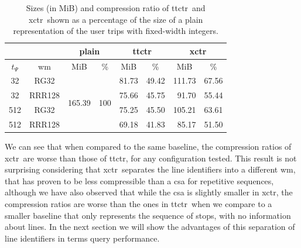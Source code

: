     \begin{table}[ht]
        \centering
        \begin{tabular}{|c|c|c|c|c|c|r|c|}
        \cline{3-8}
        \multicolumn{2}{c}{} & \multicolumn{2}{|c|}{plain} & \multicolumn{2}{|c|}{\gls{ttctr}} & \multicolumn{2}{|c|}{\gls{xctr}} \\
        \hline
        $t_{\Psi}$ & \gls{wm} & MiB & \% & \multicolumn{1}{|c|}{MiB} & \% & \multicolumn{1}{|c|}{MiB} & \% \\
        \hline
        32 & RG32 & \multirow{4}{*}{165.39} & \multirow{4}{*}{100} & 81.73 & 49.42 & 111.73 & 67.56 \\
        32 & RRR128 & & & 75.66 & 45.75 & 91.70 & 55.44 \\
        512 & RG32 & & & 75.25 & 45.50 & 105.21 & 63.61 \\
        512 & RRR128 & & & 69.18 & 41.83 & 85.17 & 51.50 \\
        \hline
        \end{tabular}
        
        \caption{Sizes (in MiB) and compression ratio of \acrshort{ttctr}~and \acrshort{xctr}~shown as a percentage of the size of a plain representation of the user trips with fixed-width integers.}
        \label{tab:comp}
    \end{table}
    
    We can see that when compared to the same baseline, the compression ratios of \gls{xctr}~are worse than those of \gls{ttctr}, for any configuration tested. This result is not surprising considering that \gls{xctr}~separates the line identifiers into a different \gls{wm}, that has proven to be less compressible than a \gls{csa} for repetitive sequences, although we have also observed that while the \gls{csa} is slightly smaller in \gls{xctr}, the compression ratios are worse than the ones in \gls{ttctr}~when we compare to a smaller baseline that only represents the sequence of stops, with no information about lines. In the next section we will show the advantages of this separation of line identifiers in terms query performance.
    
